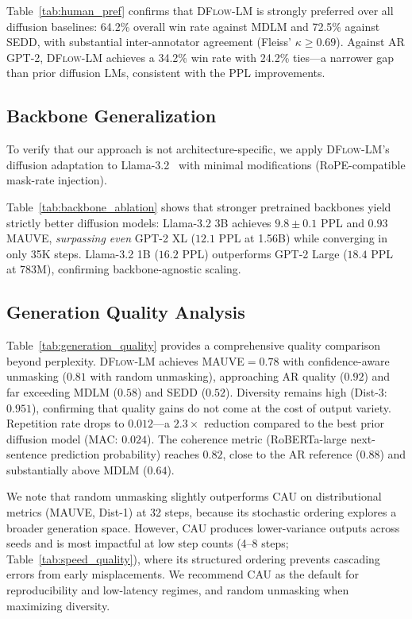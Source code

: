 \documentclass{article}
\newcommand{\ours}{\textsc{DFlow-LM}}
\begin{document}
Table~\ref{tab:human_pref} confirms that \ours{} is strongly preferred over all diffusion baselines: 64.2\% overall win rate against MDLM and 72.5\% against SEDD, with substantial inter-annotator agreement (Fleiss' $\kappa \geq 0.69$).
Against AR GPT-2, \ours{} achieves a 34.2\% win rate with 24.2\% ties---a narrower gap than prior diffusion LMs, consistent with the PPL improvements.

\subsection{Backbone Generalization}
\label{sec:exp:backbone}

To verify that our approach is not architecture-specific, we apply \ours{}'s diffusion adaptation to Llama-3.2~\citep{grattafiori2024llama3} with minimal modifications (RoPE-compatible mask-rate injection).

Table~\ref{tab:backbone_ablation} shows that stronger pretrained backbones yield strictly better diffusion models: Llama-3.2 3B achieves $9.8{\pm}0.1$ PPL and $0.93$ MAUVE, \emph{surpassing even} GPT-2 XL ($12.1$ PPL at 1.56B) while converging in only 35K steps.
Llama-3.2 1B ($16.2$ PPL) outperforms GPT-2 Large ($18.4$ PPL at 783M), confirming backbone-agnostic scaling.

\subsection{Generation Quality Analysis}
\label{sec:exp:quality}

Table~\ref{tab:generation_quality} provides a comprehensive quality comparison beyond perplexity.
\ours{} achieves MAUVE${=}0.78$ with confidence-aware unmasking ($0.81$ with random unmasking), approaching AR quality ($0.92$) and far exceeding MDLM ($0.58$) and SEDD ($0.52$).
Diversity remains high (Dist-3: $0.951$), confirming that quality gains do not come at the cost of output variety.
Repetition rate drops to $0.012$---a $2.3{\times}$ reduction compared to the best prior diffusion model (MAC: $0.024$).
The coherence metric (RoBERTa-large next-sentence prediction probability) reaches $0.82$, close to the AR reference ($0.88$) and substantially above MDLM ($0.64$).

We note that random unmasking slightly outperforms CAU on distributional metrics (MAUVE, Dist-1) at 32 steps, because its stochastic ordering explores a broader generation space.
However, CAU produces lower-variance outputs across seeds and is most impactful at low step counts (4--8 steps; Table~\ref{tab:speed_quality}), where its structured ordering prevents cascading errors from early misplacements.
We recommend CAU as the default for reproducibility and low-latency regimes, and random unmasking when maximizing diversity.
\end{document}
